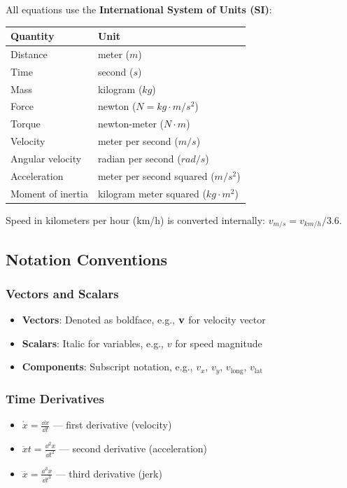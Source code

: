All equations use the \textbf{International System of Units (SI)}:
\begin{table}[h]
  \centering
  \begin{tabular}{ll}
    \toprule
    \textbf{Quantity} & \textbf{Unit} \\
    \midrule
    Distance & meter ($\unit{m}$) \\
    Time & second ($\unit{s}$) \\
    Mass & kilogram ($\unit{kg}$) \\
    Force & newton ($\unit{N} = \unit{kg \cdot m/s^2}$) \\
    Torque & newton-meter ($\unit{N \cdot m}$) \\
    Velocity & meter per second ($\unit{m/s}$) \\
    Angular velocity & radian per second ($\unit{rad/s}$) \\
    Acceleration & meter per second squared ($\unit{m/s^2}$) \\
    Moment of inertia & kilogram meter squared ($\unit{kg \cdot m^2}$) \\
    \bottomrule
  \end{tabular}
\end{table}

Speed in kilometers per hour (km/h) is converted internally: $v_{\unit{m/s}} = v_{\unit{km/h}} / 3.6$.

\subsection{Notation Conventions}

\subsubsection{Vectors and Scalars}
\begin{itemize}
  \item \textbf{Vectors}: Denoted as boldface, e.g., $\mathbf{v}$ for velocity vector
  \item \textbf{Scalars}: Italic for variables, e.g., $v$ for speed magnitude
  \item \textbf{Components}: Subscript notation, e.g., $v_x$, $v_y$, $v_{\text{long}}$, $v_{\text{lat}}$
\end{itemize}

\subsubsection{Time Derivatives}
\begin{itemize}
  \item $\dot{x} = \frac{\dd x}{\dd t}$ — first derivative (velocity)
  \item $\ddot{x}{t} = \frac{\dd^2 x}{\dd t^2}$ — second derivative (acceleration)
  \item $\dddot{x} = \frac{\dd^3 x}{\dd t^3}$ — third derivative (jerk)
\end{itemize}

